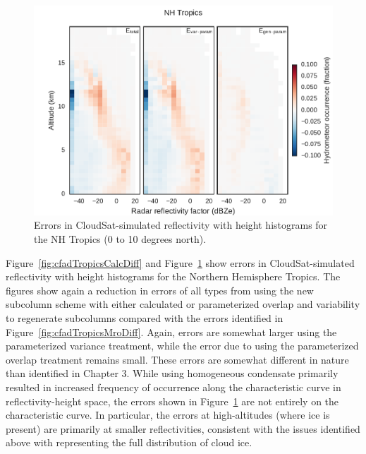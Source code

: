 \begin{figure}[htbp]
\centering
\includegraphics{graphics/subgrid2_cfadDbze94_NHTropics_gen-var-param_diff.pdf}
\caption{\label{fig:cfadTropicsParamDiff}Errors in CloudSat-simulated
reflectivity with height histograms for the NH Tropics (0 to 10 degrees
north).}\label{fig:cfadTropicsParamDiff}
\end{figure}

Figure~\ref{fig:cfadTropicsCalcDiff} and
Figure~\ref{fig:cfadTropicsParamDiff} show errors in CloudSat-simulated
reflectivity with height histograms for the Northern Hemisphere Tropics.
The figures show again a reduction in errors of all types from using the
new subcolumn scheme with either calculated or parameterized overlap and
variability to regenerate subcolumns compared with the errors identified
in Figure~\ref{fig:cfadTropicsMroDiff}. Again, errors are somewhat
larger using the parameterized variance treatment, while the error due
to using the parameterized overlap treatment remains small. These errors
are somewhat different in nature than identified in Chapter 3. While
using homogeneous condensate primarily resulted in increased frequency
of occurrence along the characteristic curve in reflectivity-height
space, the errors shown in Figure~\ref{fig:cfadTropicsParamDiff} are not
entirely on the characteristic curve. In particular, the errors at
high-altitudes (where ice is present) are primarily at smaller
reflectivities, consistent with the issues identified above with
representing the full distribution of cloud ice.

